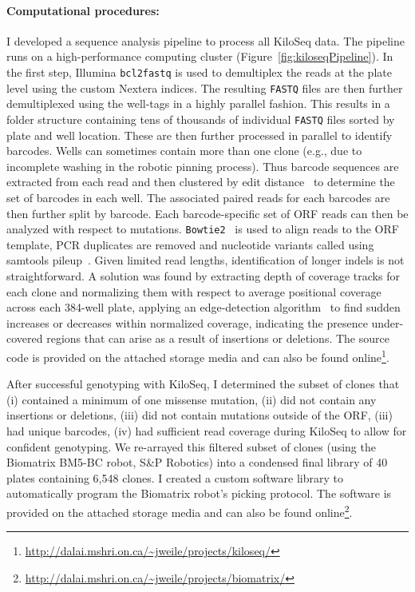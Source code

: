 \paragraph{Computational procedures:} I developed a sequence analysis pipeline to process all KiloSeq data. The pipeline runs on a high-performance computing cluster (Figure~\ref{fig:kiloseqPipeline}).
In the first step, Illumina \texttt{bcl2fastq} is used to demultiplex the reads at the plate level using the custom Nextera indices. The resulting \texttt{FASTQ} files are then further demultiplexed using the well-tags in a highly parallel fashion. This results in a folder structure containing tens of thousands of individual \texttt{FASTQ} files sorted by plate and well location. These are then further processed in parallel to identify barcodes. Wells can sometimes contain more than one clone (e.g., due to incomplete washing in the robotic pinning process). Thus barcode sequences are extracted from each read and then clustered by edit distance~\cite{levenshtein_binary_1966} to determine the set of barcodes in each well. The associated paired reads for each barcodes are then further split by barcode. Each barcode-specific set of ORF reads can then be analyzed with respect to mutations. \texttt{Bowtie2}~\cite{langmead_fast_2012} is used to align reads to the ORF template, PCR duplicates are removed and nucleotide variants called using samtools pileup~\cite{li_sequence_2009}. Given limited read lengths, identification of longer indels is not straightforward. A solution was found by extracting depth of coverage tracks for each clone and normalizing them with respect to average positional coverage across each 384-well plate, applying an edge-detection algorithm~\cite{sobel_3x3_1968} to find sudden increases or decreases within normalized coverage, indicating the presence under-covered regions that can arise as a result of insertions or deletions.
The source code is provided on the attached storage media and can also be found online\footnote{\url{http://dalai.mshri.on.ca/~jweile/projects/kiloseq/}}.

After successful genotyping with KiloSeq, I determined the subset of clones that (i) contained a minimum of one missense mutation, (ii) did not contain any insertions or deletions, (iii) did not contain mutations outside of the ORF, (iii) had unique barcodes, (iv) had sufficient read coverage during KiloSeq to allow for confident genotyping. We re-arrayed this filtered subset of clones (using the Biomatrix BM5-BC robot, S\&P Robotics) into a condensed final library of 40 plates containing 6,548 clones. I created a custom software library to automatically program the Biomatrix robot's picking protocol. The software is provided on the attached storage media and can also be found online\footnote{\url{http://dalai.mshri.on.ca/~jweile/projects/biomatrix/}}.


